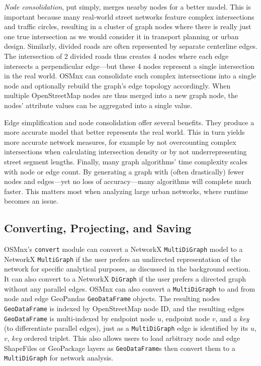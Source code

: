 \documentclass[12pt,letterpaper]{article} %
\begin{document}
\textit{Node consolidation}, put simply, merges nearby nodes for a better model. This is important because many real-world street networks feature complex intersections and traffic circles, resulting in a cluster of graph nodes where there is really just one true intersection as we would consider it in transport planning or urban design. Similarly, divided roads are often represented by separate centerline edges. The intersection of 2 divided roads thus creates 4 nodes where each edge intersects a perpendicular edge---but these 4 nodes represent a single intersection in the real world. OSMnx can consolidate such complex intersections into a single node and optionally rebuild the graph's edge topology accordingly. When multiple OpenStreetMap nodes are thus merged into a new graph node, the nodes' attribute values can be aggregated into a single value.

Edge simplification and node consolidation offer several benefits. They produce a more accurate model that better represents the real world. This in turn yields more accurate network measures, for example by not overcounting complex intersections when calculating intersection density or by not underrepresenting street segment lengths. Finally, many graph algorithms' time complexity scales with node or edge count. By generating a graph with (often drastically) fewer nodes and edges---yet no loss of accuracy---many algorithms will complete much faster. This matters most when analyzing large urban networks, where runtime becomes an issue.

\subsection{Converting, Projecting, and Saving}

OSMnx's \texttt{convert} module can convert a NetworkX \texttt{MultiDiGraph} model to a NetworkX \texttt{MultiGraph} if the user prefers an undirected representation of the network for specific analytical purposes, as discussed in the background section. It can also convert to a NetworkX \texttt{DiGraph} if the user prefers a directed graph without any parallel edges. OSMnx can also convert a \texttt{MultiDiGraph} to and from node and edge GeoPandas \texttt{GeoDataFrame} objects. The resulting nodes \texttt{GeoDataFrame} is indexed by OpenStreetMap node ID, and the resulting edges \texttt{GeoDataFrame} is multi-indexed by endpoint node $u$, endpoint node $v$, and a \textit{key} (to differentiate parallel edges), just as a \texttt{MultiDiGraph} edge is identified by its $u$, $v$, \textit{key} ordered triplet. This also allows users to load arbitrary node and edge ShapeFiles or GeoPackage layers as \texttt{GeoDataFrame}s then convert them to a \texttt{MultiDiGraph} for network analysis.
\end{document}
